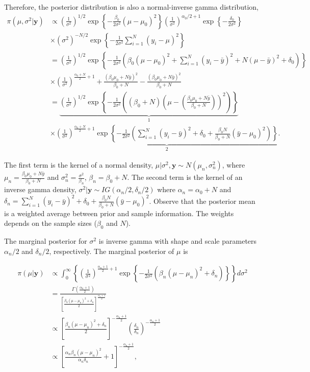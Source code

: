 \begin{enumerate}
Therefore, the posterior distribution is also a normal-inverse gamma distribution,
{\footnotesize{
\begin{align}
	\pi(\mu,\sigma^2|\mathbf{y})&\propto \left(\frac{1}{\sigma^2}\right)^{1/2}\exp\left\{-\frac{\beta_0}{2\sigma^2}(\mu-\mu_0)^2\right\}\left(\frac{1}{\sigma^2}\right)^{\alpha_0/2+1}\exp\left\{-\frac{\delta_0}{2\sigma^2}\right\}\nonumber\\
	&\times(\sigma^2)^{-N/2}\exp\left\{-\frac{1}{2\sigma^2}\sum_{i=1}^N (y_i-\mu)^2\right\}\nonumber\\
	& = \left(\frac{1}{\sigma^2}\right)^{1/2}\exp\left\{-\frac{1}{2\sigma^2}\left(\beta_0(\mu-\mu_0)^2+\sum_{i=1}^N (y_i-\bar{y})^2+N(\mu-\bar{y})^2+\delta_0\right)\right\}\nonumber\\
	& \times\left(\frac{1}{\sigma^2}\right)^{\frac{\alpha_0+N}{2}+1} + \frac{(\beta_0\mu_0+N\bar{y})^2}{\beta_0+N} - \frac{(\beta_0\mu_0+N\bar{y})^2}{\beta_0+N}\nonumber\\
	& = \underbrace{\left(\frac{1}{\sigma^2}\right)^{1/2}\exp\left\{-\frac{1}{2\sigma^2}\left((\beta_0+N)\left(\mu-\left(\frac{\beta_0\mu_0+N\bar{y}}{\beta_0+N}\right)\right)^2\right)\right\}}_{1}\nonumber\\
	& \times \underbrace{\left(\frac{1}{\sigma^2}\right)^{\frac{\alpha_0+N}{2}+1}\exp\left\{-\frac{1}{2\sigma^2}\left(\sum_{i=1}^N (y_i-\bar{y})^2+\delta_0+\frac{\beta_0N}{\beta_0+N}(\bar{y}-\mu_0)^2\right)\right\}}_{2}.\nonumber
\end{align}
}}

The first term is the kernel of a normal density, $\mu|\sigma^2,\mathbf{y}\sim N \left(\mu_n, \sigma_n^2\right)$, where $\mu_n=\frac{\beta_0\mu_0+N\bar{y}}{\beta_0+N}$ and $\sigma_n^2=\frac{\sigma^2}{\beta_n}$, $\beta_n=\beta_0+N$. The second term is the kernel of an inverse gamma density, $\sigma^2|\mathbf{y}\sim IG(\alpha_n/2,\delta_n/2)$ where $\alpha_n=\alpha_0+N$ and $\delta_n=\sum_{i=1}^N (y_i-\bar{y})^2+\delta_0+\frac{\beta_0N}{\beta_0+N}(\bar{y}-\mu_0)^2$. Observe that the posterior mean is a weighted average between prior and sample information. The weights depends on the sample sizes ($\beta_0$ and $N$).

The marginal posterior for $\sigma^2$ is inverse gamma with shape and scale parameters $\alpha_n/2$ and $\delta_n/2$, respectively. The marginal posterior of $\mu$ is

\begin{align}
	\pi(\mu|\mathbf{y})&\propto \int_{0}^{\infty}\left\{ \left(\frac{1}{\sigma^2}\right)^{\frac{\alpha_n+1}{2}+1}\exp\left\{-\frac{1}{2\sigma^2}(\beta_n(\mu-\mu_n)^2+\delta_n)\right\}\right\}d\sigma^2\nonumber\\
	&=\frac{\Gamma\left(\frac{\alpha_n+1}{2}\right)}{\left[\frac{\beta_n(\mu-\mu_n)^2+\delta_n}{2}\right]^{\frac{\alpha_n+1}{2}}}\nonumber\\
	&\propto \left[\frac{\beta_n(\mu-\mu_n)^2+\delta_n}{2}\right]^{-\frac{\alpha_n+1}{2}}\left(\frac{\delta_n}{\delta_n}\right)^{-\frac{\alpha_n+1}{2}}\nonumber\\
	&\propto \left[\frac{\alpha_n\beta_n(\mu-\mu_n)^2}{\alpha_n\delta_n}+1\right]^{-\frac{\alpha_n+1}{2}},\nonumber
\end{align}


\end{enumerate}
